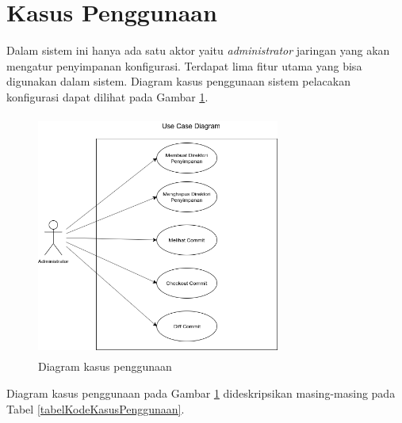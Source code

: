     \section{Kasus Penggunaan}
    	Dalam sistem ini hanya ada satu aktor yaitu \textit{administrator} jaringan yang akan mengatur penyimpanan konfigurasi. Terdapat lima fitur utama yang bisa digunakan dalam sistem. Diagram kasus penggunaan sistem pelacakan konfigurasi dapat dilihat pada Gambar \ref{usecase}.
        \begin{figure}[H]
			\centering
			\includegraphics[width=8cm,height=8cm]{Images/C-3/UC-2.png}
			\caption{Diagram kasus penggunaan}
			\label{usecase}
		\end{figure}
        \indent Diagram kasus penggunaan pada Gambar \ref{usecase} dideskripsikan masing-masing pada Tabel \ref {tabelKodeKasusPenggunaan}.
        
